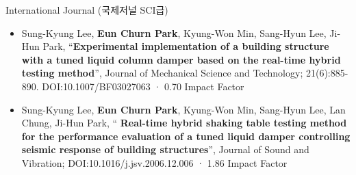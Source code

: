 \documentclass[usepdftitle=false]{beamer}
\begin{document}
\begin{frame}{International Journal (국제저널 SCI급)}
\begin{itemize}
\item Sung-Kyung Lee, \textbf{Eun Churn Park}, Kyung-Won Min, Sang-Hyun Lee, Ji-Hun Park, “\textbf{Experimental implementation of a building structure with a tuned liquid column damper based on the real-time hybrid testing method}”, Journal of Mechanical Science and Technology; 21(6):885-890. DOI:10.1007/BF03027063 · 0.70 Impact Factor
\item Sung-Kyung Lee, \textbf{Eun Churn Park}, Kyung-Won Min, Sang-Hyun Lee, Lan Chung, Ji-Hun Park, “ \textbf{Real-time hybrid shaking table testing method for the performance evaluation of a tuned liquid damper controlling seismic response of building structures}”, Journal of Sound and Vibration; DOI:10.1016/j.jsv.2006.12.006 · 1.86 Impact Factor
\end{itemize}
\end{frame}
\end{document}
